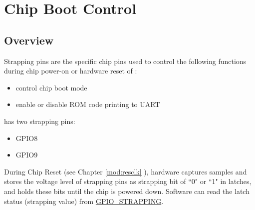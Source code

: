 \documentclass[main\_\_EN.tex]{subfiles}
\begin{document}

\ifglobal
\else
    {\let\clearpage\relax \listoftodos}
    \tableofcontents
\fi



\hypertarget{bootctrl}{}
\chapter{Chip Boot Control}
\label{mod:bootctrl}

\section{Overview}

Strapping pins are the specific chip pins used to control the following functions during chip power-on or hardware reset of \chipname{}:
\begin{itemize}
    \item control chip boot mode
    \item enable or disable ROM code printing to UART
\end{itemize}
\chipname{} has two strapping pins:
\begin{itemize}
    \item GPIO8
    \item GPIO9
\end{itemize}


During Chip Reset (see Chapter \ref{mod:resclk} \textit{}), hardware captures samples and stores the voltage level of strapping pins as strapping bit of ``0" or ``1" in latches, and holds these bits until the chip is powered down. Software can read the latch status (strapping value) from \hyperref[fielddesc:GPIOSTRAPPING]{GPIO\_STRAPPING}.
\end{document}
